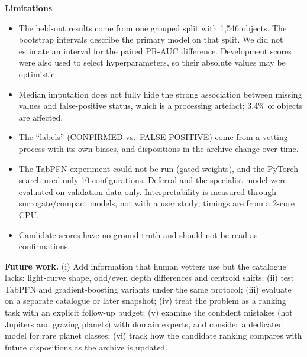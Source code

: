 \documentclass[11pt,a4paper]{article}
\begin{document}
\textbf{Limitations}\label{sec:limits}
\begin{itemize}
\item The held-out results come from one grouped split with 1,546 objects. The bootstrap intervals describe the primary model on that split. We did not estimate an interval for the paired PR-AUC difference. Development scores were also used to select hyperparameters, so their absolute values may be optimistic.
\item Median imputation does not fully hide the strong association between missing values and false-positive status, which is a processing artefact; 3.4\% of objects are affected.
\item The ``labels'' (CONFIRMED vs.\ FALSE POSITIVE) come from a vetting process with its own biases, and dispositions in the archive change over time.
\item The TabPFN experiment could not be run (gated weights), and the PyTorch search used only 10 configurations. Deferral and the specialist model were evaluated on validation data only. Interpretability is measured through surrogate/compact models, not with a user study; timings are from a 2-core CPU.
\item Candidate scores have no ground truth and should not be read as confirmations.
\end{itemize}

\textbf{Future work.} (i) Add information that human vetters use but the catalogue lacks: light-curve shape, odd/even depth differences and centroid shifts; (ii) test TabPFN and gradient-boosting variants under the same protocol; (iii) evaluate on a separate catalogue or later snapshot; (iv) treat the problem as a ranking task with an explicit follow-up budget; (v) examine the confident mistakes (hot Jupiters and grazing planets) with domain experts, and consider a dedicated model for rare planet classes; (vi) track how the candidate ranking compares with future dispositions as the archive is updated.
\end{document}
